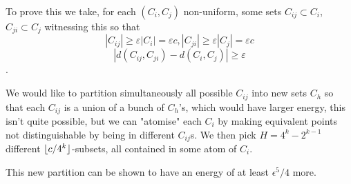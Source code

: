\documentclass[oneside,12pt,]{article}
\DeclarePairedDelimiter\floor{\lfloor}{\rfloor}
\begin{document}
To prove this we take, for each $(C_i,C_j)$ non-uniform, some sets $C_{ij} \subset C_i$, $C_{ji} \subset C_j$ witnessing this so that
$$\left|C_{i j}\right| \geq \varepsilon\left|C_i\right|=\varepsilon c, \left|C_{j i}\right| \geq \varepsilon\left|C_j\right|=\varepsilon c$$
$$\left|d\left(C_{i j}, C_{j i}\right)-d\left(C_i, C_j\right)\right| \geq \varepsilon$$.

We would like to partition simultaneously all possible $C_{ij}$ into new sets $C_h$ so that each $C_{ij}$ is a union of a bunch of $C_h$'s, which would have larger energy, this isn't quite possible, but we can "atomise" each $C_i$ by making equivalent points not distinguishable by being in different $C_{ij}$s.
We then pick $H = 4^k - 2^{k-1}$ different $\floor{c/4^k}$-subsets, all contained in some atom of $C_i$.

This new partition can be shown to have an energy of at least $\epsilon ^5 /4 $ more.
\end{document}
